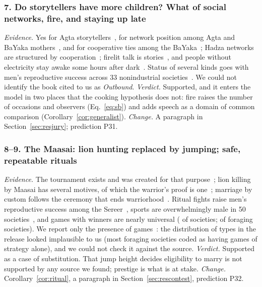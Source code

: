 \subsubsection{7. Do storytellers have more children? What of social networks, fire, and staying up late}
\emph{Evidence.} Yes for Agta storytellers~\cite{smith2017}, for network position among Agta and BaYaka
mothers~\cite{page2017}, and for cooperative ties among the BaYaka~\cite{chaudhary2016}; Hadza networks are structured by
cooperation~\cite{apicella2012}; firelit talk is stories~\cite{wiessner2014,dunbar2014}, and people without electricity
stay awake some hours after dark~\cite{yetish2015}. Status of several kinds goes with men's reproductive success across
33 nonindustrial societies~\cite{vonrueden2016}. We could not identify the book cited to us as \emph{Outbound}. \emph{Verdict.}
Supported, and it enters the model in two places that the cooking hypothesis does not: fire raises the number of occasions
and observers (Eq.~\ref{eq:sb}) and adds speech as a domain of common comparison (Corollary~\ref{cor:generalist}).
\emph{Change.} A paragraph in Section~\ref{sec:resjury}; prediction P31.

\subsubsection{8--9. The Maasai: lion hunting replaced by jumping; safe, repeatable rituals}
\emph{Evidence.} The tournament exists and was created for that purpose~\cite{maasaiolympics,aljazeera2022}; lion killing by
Maasai has several motives, of which the warrior's proof is one~\cite{hazzah2009,goldman2013}; marriage by custom follows
the ceremony that ends warriorhood~\cite{aljazeera2023,spencer1988}. Ritual fights raise men's reproductive success among the
Sereer~\cite{llaurens2009}, sports are overwhelmingly male in 50 societies~\cite{deaner2013}, and games with winners are
nearly universal (\CcGamesAny{} of \CcGamesN{} societies; \CcGamesForAny{} of \CcGamesForN{} foraging societies). We report
only the presence of games~\cite{roberts1959}: the distribution of types in the release looked implausible to us (most
foraging societies coded as having games of strategy alone), and we could not check it against the source. \emph{Verdict.} Supported as a case of substitution.
That jump height decides eligibility to marry is not supported by any source we found; prestige is what is at stake.
\emph{Change.} Corollary~\ref{cor:ritual}, a paragraph in Section~\ref{sec:rescontest}, prediction P32.

